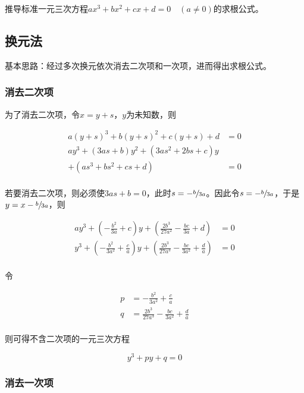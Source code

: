 

推导标准一元三次方程$ax^3 + bx^2 + cx + d = 0\quad(a \ne0)$的求根公式。


\subsection{换元法}

基本思路：经过多次换元依次消去二次项和一次项，进而得出求根公式。

\subsubsection{消去二次项}

为了消去二次项，令$x = y + s$，$y$为未知数，则

\begin{align*}
  a(y + s)^3 + b(y + s)^2 + c(y + s) + d &= 0 \\
  ay^3 + (3as + b)y^2 + (3as^2 + 2bs + c)y & \\
  + (as^3 + bs^2 + cs + d) &= 0 \\
\end{align*}

若要消去二次项，则必须使$3as + b = 0$，此时$s = -\sfrac b{3a}$。因此令$s = -\sfrac b{3a}$，于是$y = x - \sfrac b{3a}$，则

\begin{align*}
  ay^3 + \left(-\frac{b^2}{3a} + c\right)y + \left(\frac{2b^3}{27a^2} - \frac{bc}{3a} + d\right) &= 0 \\
  y^3 + \left(-\frac{b^2}{3a^2} + \frac ca\right)y + \left(\frac{2b^3}{27a^3} - \frac{bc}{3a^2} + \frac da\right) &= 0 \\
\end{align*}

令

\begin{align*}
  p &= -\frac{b^2}{3a^2} + \frac ca \\
  q &= \frac{2b^3}{27a^3} - \frac{bc}{3a^2} + \frac da \\
\end{align*}

则可得不含二次项的一元三次方程

\[ y^3 + py + q = 0 \]

\subsubsection{消去一次项}

